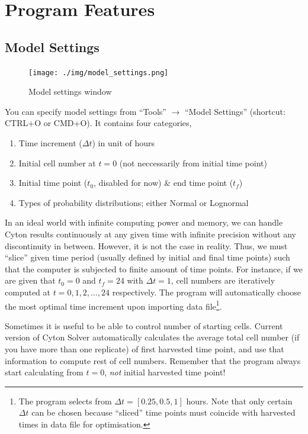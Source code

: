 \documentclass{article}
\newcommand{\enterProblemHeader}[1]{
    }
\newcommand{\exitProblemHeader}[1]{
    }
\newcounter{homeworkProblemCounter} %
\newcommand{\homeworkProblemName}{}
\newenvironment{homeworkProblem}[1][Problem \arabic{homeworkProblemCounter}]{ %
    \stepcounter{homeworkProblemCounter} %
    \renewcommand{\homeworkProblemName}{#1} %
    \section{\homeworkProblemName} %
    \enterProblemHeader{\homeworkProblemName} %
    }{
    \exitProblemHeader{\homeworkProblemName} %
    }
\begin{document}
\begin{homeworkProblem}[Program Features]
        \subsection{Model Settings}
        \begin{figure}[h]
            \centering
            \texttt{[image: ./img/model\_settings.png]}
            \caption{Model settings window}
            \label{fig:model_settings}
        \end{figure}
        You can specify model settings from ``Tools'' $\rightarrow$ ``Model Settings'' (shortcut: CTRL+O or CMD+O). It contains four categories,
        \begin{enumerate}
            \item Time increment ($\Delta t$) in unit of hours 
            \item Initial cell number at $t = 0$ (not neccessarily from initial time point)
            \item Initial time point ($t_0$, disabled for now) \& end time point ($t_f$)
            \item Types of probability distributions; either Normal or Lognormal
        \end{enumerate}
        In an ideal world with infinite computing power and memory, we can handle Cyton results continuously at any given time with infinite precision without any discontinuity in between. However, it is not the case in reality. Thus, we must ``slice'' given time period (usually defined by initial and final time points) such that the computer is subjected to finite amount of time points. For instance, if we are given that $t_0=0$ and $t_f=24$ with $\Delta t=1$, cell numbers are iteratively computed at $t=0, 1, 2, \dots, 24$ respectively. The program will automatically choose the most optimal time increment upon importing data file\footnote{The program selects from $\Delta t = [0.25, 0.5, 1]$ hours. Note that only certain $\Delta t$ can be chosen because ``sliced'' time points must coincide with harvested times in data file for optimisation.}.

        Sometimes it is useful to be able to control number of starting cells. Current version of Cyton Solver automatically calculates the average total cell number (if you have more than one replicate) of first harvested time point, and use that information to compute rest of cell numbers. Remember that the program always start calculating from $t=0$, \textit{not} initial harvested time point!


\end{homeworkProblem}
\end{document}
